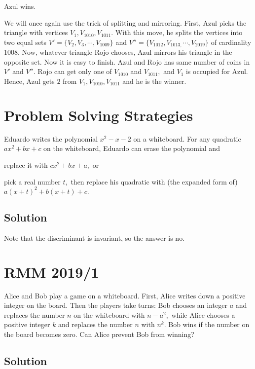 \documentclass{article}
\begin{document}
Azul wins.

We will once again use the trick of splitting and mirroring. First, Azul picks the triangle with vertices $V_1, V_{1010}, V_{1011}.$ With this move, he splits the vertices into two equal sets $V' = \{V_2, V_3, \cdots, V_{1009} \}$ and $V'' =\{V_{1012}, V_{1013,} \cdots, V_{2019}\} $ of cardinality $1008.$ Now, whatever triangle Rojo chooses, Azul mirrors his triangle in the opposite set. Now it is easy to finish. Azul and Rojo has same number of coins in $V'$ and $V''.$ Rojo can get only one of $V_{1010}$ and $V_{1011},$ and $V_1$ is occupied for Azul. Hence, Azul gets $2$ from $V_1, V_{1010}, V_{1011}$ and he is the winner.

\pagebreak\section{Problem Solving Strategies}

Eduardo writes the polynomial $x^2-x-2$ on a whiteboard. For any quadratic $ax^2+bx+c$ on the whiteboard, Eduardo can erase the polynomial and
\begin{itemize}
        \Item replace it with $cx^2 + bx + a,$ or
        
        \Item pick a real number $t,$ then replace his quadratic with (the expanded form of)
$a(x + t)^2 + b(x + t) + c.$
\end{itemize}

\subsection{Solution}

Note that the discriminant is invariant, so the answer is no.

\pagebreak\section{RMM 2019/1}

Alice and Bob play a game on a whiteboard. First, Alice writes down a positive integer on the board. Then the players take turns: Bob chooses an integer $a$ and replaces the number $n$ on the whiteboard with $n-a^2,$ while Alice chooses a positive integer $k$ and replaces the number $n$ with $n^k.$ Bob wins if the number on the board becomes zero. Can Alice prevent Bob from winning?

\subsection{Solution}
 
\end{document}
